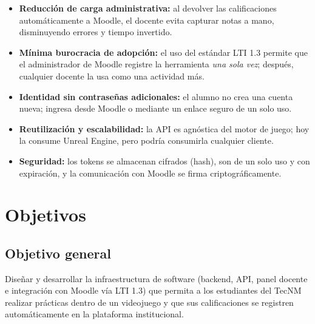 \documentclass[12pt,letterpaper,oneside]{report}
\begin{document}
\begin{itemize}[leftmargin=1.4em]
  \item \textbf{Reducción de carga administrativa:} al devolver las
  calificaciones automáticamente a Moodle, el docente evita capturar notas a
  mano, disminuyendo errores y tiempo invertido.
  \item \textbf{Mínima burocracia de adopción:} el uso del estándar LTI 1.3
  permite que el administrador de Moodle registre la herramienta \emph{una sola
  vez}; después, cualquier docente la usa como una actividad más.
  \item \textbf{Identidad sin contraseñas adicionales:} el alumno no crea una
  cuenta nueva; ingresa desde Moodle o mediante un enlace seguro de un solo uso.
  \item \textbf{Reutilización y escalabilidad:} la API es agnóstica del motor de
  juego; hoy la consume Unreal Engine, pero podría consumirla cualquier cliente.
  \item \textbf{Seguridad:} los tokens se almacenan cifrados (hash), son de un
  solo uso y con expiración, y la comunicación con Moodle se firma
  criptográficamente.
\end{itemize}

\chapter{Objetivos}

\section{Objetivo general}
Diseñar y desarrollar la infraestructura de software (backend, API, panel
docente e integración con Moodle vía LTI 1.3) que permita a los estudiantes del
TecNM realizar prácticas dentro de un videojuego y que sus calificaciones se
registren automáticamente en la plataforma institucional.
\end{document}
